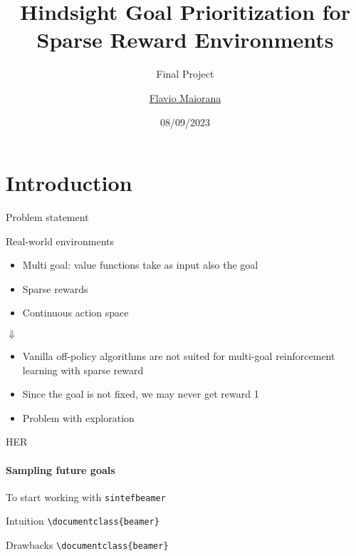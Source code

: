 \documentclass{beamer}
\title{Hindsight Goal Prioritization for Sparse Reward Environments}
\subtitle{Final Project}
\author{\href{mailto:maiorana.2051396@studenti.uniroma1.it}{Flavio Maiorana}}
\date{08/09/2023}
\begin{document}
\maketitle

\section{Introduction}

      \begin{frame}{Problem statement}
            \begin{block}{Real-world environments}
                  \begin{itemize}
                        \item Multi goal: value functions take as input also the goal
                        \item Sparse rewards
                        \item Continuous action space
                  \end{itemize}  
            \end{block}

            $\Downarrow$ \centering \\

            \begin{block}{}

            \end{block}
      \end{frame}

      \begin{frame}
            \begin{itemize}
                  \item Vanilla off-policy algorithms are not suited for multi-goal reinforcement learning with sparse reward
                  \item Since the goal is not fixed, we may never get reward 1
                  \item Problem with exploration
            \end{itemize}  
      \end{frame}


      \begin{frame}[fragile]{HER}
            \framesubtitle{Sampling future goals}
            To start working with \texttt{sintefbeamer}
            \begin{block}{Intuition}
                  \verb|\documentclass{beamer}|\\
            \end{block}
            \begin{block}{Drawbacks}
                  \verb|\documentclass{beamer}|\\
            \end{block}
      \end{frame}
\end{document}
